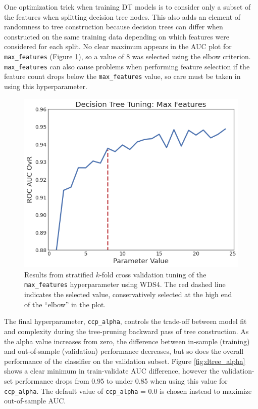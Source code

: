 One optimization trick when training DT models is to consider only a subset of the features when splitting decision tree nodes. This also adds an element of randomness to tree construction because decision trees can differ when constructed on the same training data depending on which features were considered for each split. No clear maximum appears in the AUC plot for \verb|max_features| (Figure \ref{fig:dtree_max_features}), so a value of 8 was selected using the elbow criterion. \verb|max_features| can also cause problems when performing feature selection if the feature count drops below the \verb|max_features| value, so care must be taken in using this hyperparameter.

\begin{figure}[!htp]
\centering
\includegraphics[width=.6\textwidth]{templates/images/Figure-DT_tuning_max_features.png}
\caption[Decision tree max features tuning]{Results from stratified $k$-fold cross validation tuning of the \texttt{max\_features} hyperparameter using WDS4. The red dashed line indicates the selected value, conservatively selected at the high end of the ``elbow'' in the plot.}
\label{fig:dtree_max_features}
\end{figure}

The final hyperparameter, \verb|ccp_alpha|, controls the trade-off between model fit and complexity during the tree-pruning backward pass of tree construction. As the alpha value increases from zero, the difference between in-sample (training) and out-of-sample (validation) performance decreases, but so does the overall performance of the classifier on the validation subset. Figure \ref{fig:dtree_alpha} shows a clear minimum in train-validate AUC difference, however the validation-set performance drops from 0.95 to under 0.85 when using this value for \verb|ccp_alpha|. The default value of \verb|ccp_alpha| = 0.0 is chosen instead to maximize out-of-sample AUC.

